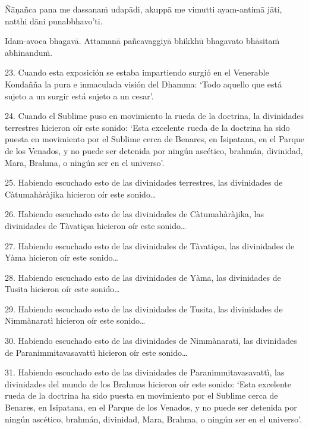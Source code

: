 Ñāṇañca pana me dassanaṁ udapādi, akuppā me vimutti ayam-antimā jāti,
natthi dāni punabbhavo'ti.

Idam-avoca bhagavā. Attamanā pañcavaggiyā bhikkhū bhagavato bhāsitaṁ
abhinanduṁ.

\clearpage

\englishText
\markboth{\englishTitle}{\rightmark}

23. Cuando esta exposición se estaba impartiendo surgió en el Venerable Kondañña la pura e inmaculada visión del Dhamma: ‘Todo aquello que está sujeto a un surgir está sujeto a un cesar’.

24. Cuando el Sublime puso en movimiento la rueda de la doctrina, la divinidades terrestres hicieron oír este sonido: ‘Esta excelente rueda de la doctrina ha sido puesta en movimiento por el Sublime cerca de Benares, en Isipatana, en el Parque de los Venados, y no puede ser detenida por ningún ascético, brahmán, divinidad, Mara, Brahma, o ningún ser en el universo’.

25. Habiendo escuchado esto de las divinidades terrestres, las divinidades de Càtumahàràjika hicieron oír este sonido\ldots

26. Habiendo escuchado esto de las divinidades de Càtumahàràjika, las divinidades de Tàvatiçsa hicieron oír este sonido\ldots

27. Habiendo escuchado esto de las divinidades de Tàvatiçsa, las divinidades de Yàma hicieron oír este sonido\ldots  

28. Habiendo escuchado esto de las divinidades de Yàma, las divinidades de Tusita hicieron oír este sonido\ldots

29. Habiendo escuchado esto de las divinidades de Tusita, las divinidades de Nimmànaratì hicieron oír este sonido\ldots

30. Habiendo escuchado esto de las divinidades de Nimmànarati, las divinidades de Paranimmitavasavattì hicieron oír este sonido\ldots

31. Habiendo escuchado esto de las divinidades de Paranimmitavasavattì, las divinidades del mundo de los Brahmas hicieron oír este sonido: ‘Esta excelente rueda de la doctrina ha sido puesta en movimiento por el Sublime cerca de Benares, en Isipatana, en el Parque de los Venados, y no puede ser detenida por ningún ascético, brahmán, divinidad, Mara, Brahma, o ningún ser en el universo’.



\clearpage

\paliText
\markboth{\paliTitle}{\rightmark}

